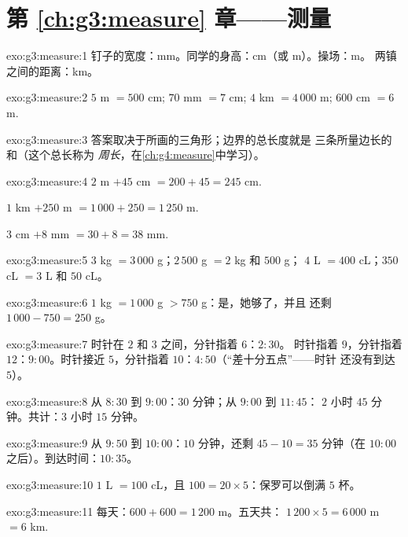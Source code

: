 \section*{第 \ref{ch:g3:measure} 章——测量}

\begin{solution}{exo:g3:measure:1}
钉子的宽度：mm。同学的身高：cm（或 m）。操场：m。
两镇之间的距离：km。
\end{solution}

\begin{solution}{exo:g3:measure:2}
$5$ m $= 500$ cm; \quad $70$ mm $= 7$ cm; \quad
$4$ km $= 4\,000$ m; \quad $600$ cm $= 6$ m.
\end{solution}

\begin{solution}{exo:g3:measure:3}
答案取决于所画的三角形；边界的总长度就是
三条所量边长的和（这个总长称为
\emph{周长}，在\cref{ch:g4:measure}中学习）。
\end{solution}

\begin{solution}{exo:g3:measure:4}
$2$ m $+ 45$ cm $= 200 + 45 = 245$ cm.

$1$ km $+ 250$ m $= 1\,000 + 250 = 1\,250$ m.

$3$ cm $+ 8$ mm $= 30 + 8 = 38$ mm.
\end{solution}

\begin{solution}{exo:g3:measure:5}
$3$ kg $= 3\,000$ g；\quad $2\,500$ g $= 2$ kg 和 $500$ g；\quad
$4$ L $= 400$ cL；\quad $350$ cL $= 3$ L 和 $50$ cL。
\end{solution}

\begin{solution}{exo:g3:measure:6}
$1$ kg $= 1\,000$ g $> 750$ g：是，她够了，并且
还剩 $1\,000 - 750 = 250$ g。
\end{solution}

\begin{solution}{exo:g3:measure:7}
时针在 $2$ 和 $3$ 之间，分针指着 $6$：$2{:}30$。
时针指着 $9$，分针指着 $12$：$9{:}00$。时针接近
$5$，分针指着 $10$：$4{:}50$（“差十分五点”——时针
还没有到达 $5$）。
\end{solution}

\begin{solution}{exo:g3:measure:8}
从 $8{:}30$ 到 $9{:}00$：$30$ 分钟；从 $9{:}00$ 到 $11{:}45$：
$2$ 小时 $45$ 分钟。共计：$3$ 小时 $15$ 分钟。
\end{solution}

\begin{solution}{exo:g3:measure:9}
从 $9{:}50$ 到 $10{:}00$：$10$ 分钟，还剩
$45 - 10 = 35$ 分钟（在 $10{:}00$ 之后）。到达时间：$10{:}35$。
\end{solution}

\begin{solution}{exo:g3:measure:10}
$1$ L $= 100$ cL，且 $100 = 20 \times 5$：保罗可以倒满
$5$ 杯。
\end{solution}

\begin{solution}{exo:g3:measure:11}
每天：$600 + 600 = 1\,200$ m。五天共：
$1\,200 \times 5 = 6\,000$ m $= 6$ km.
\end{solution}
